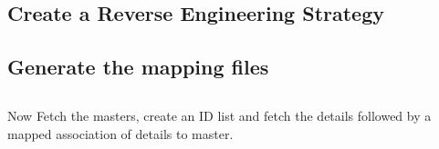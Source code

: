 \subsection{Create a Reverse Engineering Strategy}

\subsection{Generate the mapping files}

\subsection{  }
Now Fetch the masters, create an ID list and fetch the details followed by a mapped association of details to master.


\label{CreateTheSchema}




